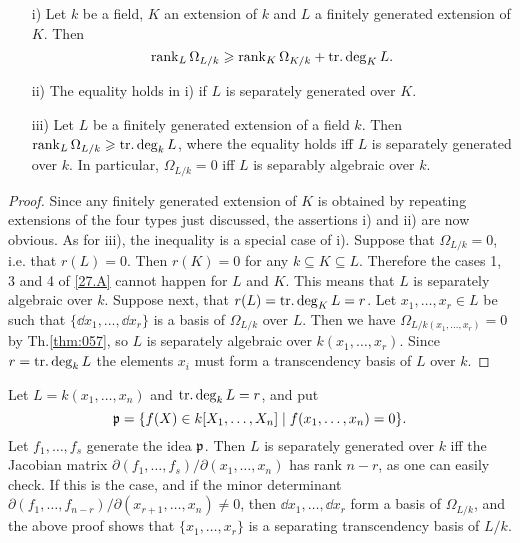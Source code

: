 \documentclass[../main]{subfiles}
\begin{document}
\begin{partheorem}
\label{thm:059}
\begin{enumerate}
    \item[i)] Let $k$ be a field, $K$ an extension of $k$ and $L$ a finitely generated extension of $K$. Then \[\operatorname{rank}_L \Omega_{L/k} \geqslant \operatorname{rank}_K \Omega_{K/k} + \operatorname{tr. deg}_K L.\]
    \item[ii)] The equality holds in i) if $L$ is separately generated over $K$. 
    \item[iii)] Let $L$ be a finitely generated extension of a field $k$. Then \newline $\operatorname{rank}_L \Omega_{L/k} \geqslant \operatorname{tr. deg}_k L$, where the equality holds iff $L$ is separately generated over $k$. In particular, $\Omega_{L/k} = 0$ iff $L$ is separably algebraic over $k$. 
\end{enumerate}
\end{partheorem}

\begin{proof}
Since any finitely generated extension of $K$ is obtained by repeating extensions of the four types just discussed, the assertions i) and ii) are now obvious. As for iii), the inequality is a special case of i). Suppose that $\Omega_{L/k} = 0$, i.e. that $r(L) = 0$. Then $r(K) = 0$ for any $k \subseteq K \subseteq L$. Therefore the cases 1, 3 and 4 of \ref{27.A} cannot happen for $L$ and $K$. This means that $L$ is separately algebraic over $k$. Suppose next, that $r(L) = \operatorname{tr. deg}_K L = r$. Let $x_1, \ldots, x_r \in L$ be such that $\{\dd x_1, \ldots, \dd x_r\}$ is a basis of $\Omega_{L/k}$ over $L$. Then we have $\Omega_{L/k(x_1, \ldots, x_r)} = 0$ by Th.\ref{thm:057}, so $L$ is separately algebraic over $k(x_1, \ldots, x_r)$. Since $r = \operatorname{tr. deg}_k L$ the elements $x_i$ must form a transcendency basis of $L$ over $k$. 
\end{proof}

\begin{remark}
Let $L = k(x_1, \ldots, x_n)$ and $\operatorname{tr. deg}_k L = r$, and put\[\mathfrak{p} = \{f(X) \in k[X_1, \dots, X_n] \mid f(x_1, \dots, x_n) = 0\}.\]
Let $f_1, \ldots, f_s$ generate the idea $\mathfrak{p}$. Then $L$ is separately generated over $k$ iff the Jacobian matrix $\partial(f_1, \ldots, f_s)/\partial(x_1, \ldots, x_n)$ has rank $n - r$, as one can easily check. If this is the case, and if the minor determinant \newline $\partial(f_1, \ldots, f_{n - r})/\partial(x_{r + 1}, \ldots, x_n) \ne 0$, then $\dd x_1, \ldots, \dd x_r$ form a basis of $\Omega_{L/k}$, and the above proof shows that $\{x_1, \ldots, x_r\}$ is a separating transcendency basis of $L/k$. 
\end{remark}
\end{document}
